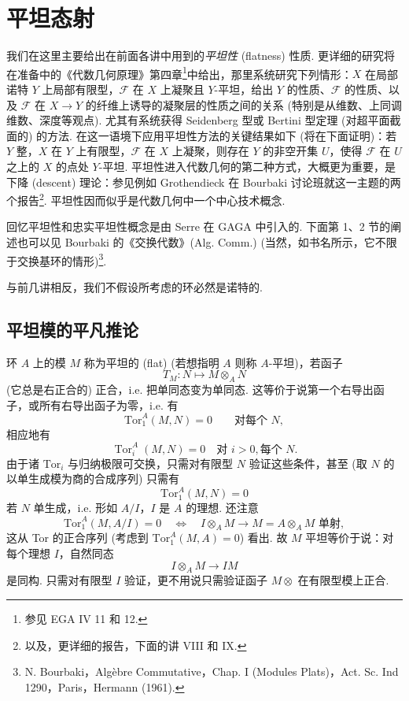 \chapter{平坦态射}

我们在这里主要给出在前面各讲中用到的\emph{平坦性} (flatness) 性质. 更详细的研究将在准备中的《代数几何原理》第四章\footnote{参见 EGA IV 11 和 12.}中给出，那里系统研究下列情形：$X$ 在局部诺特 $Y$ 上局部有限型，$\mathcal{F}$ 在 $X$ 上凝聚且 $Y$-平坦，给出 $Y$ 的性质、$\mathcal{F}$ 的性质、以及 $\mathcal{F}$ 在 $X \to Y$ 的纤维上诱导的凝聚层的性质之间的关系 (特别是从维数、上同调维数、深度等观点). 尤其有系统获得 Seidenberg 型或 Bertini 型定理 (对超平面截面的) 的方法. 在这一语境下应用平坦性方法的关键结果如下 (将在下面证明)：若 $Y$ 整，$X$ 在 $Y$ 上有限型，$\mathcal{F}$ 在 $X$ 上凝聚，则存在 $Y$ 的非空开集 $U$，使得 $\mathcal{F}$ 在 $U$ 之上的 $X$ 的点处 $Y$-平坦. 平坦性进入代数几何的第二种方式，大概更为重要，是下降 (descent) 理论：参见例如 Grothendieck 在 Bourbaki 讨论班就这一主题的两个报告\footnote{以及，更详细的报告，下面的讲 VIII 和 IX.}. 平坦性因而似乎是代数几何中一个中心技术概念.

回忆平坦性和忠实平坦性概念是由 Serre 在 GAGA 中引入的. 下面第 1、2 节的阐述也可以见 Bourbaki 的《交换代数》(Alg. Comm.) (当然，如书名所示，它不限于交换基环的情形)\footnote{N. Bourbaki，Algèbre Commutative，Chap. I (Modules Plats)，Act. Sc. Ind 1290，Paris，Hermann (1961).}.

与前几讲相反，我们不假设所考虑的环必然是诺特的.

\section{平坦模的平凡推论}

环 $A$ 上的模 $M$ 称为平坦的 (flat) (若想指明 $A$ 则称 $A$-平坦)，若函子
\[
T_M \colon N \longmapsto M \otimes_A N
\]
(它总是右正合的) 正合，i.e. 把单同态变为单同态. 这等价于说第一个右导出函子，或所有右导出函子为零，i.e. 有
\[
\mathrm{Tor}_{1}^{A}(M, N) = 0 \qquad \text{对每个 } N,
\]
相应地有
\[
\operatorname{Tor}_{i}^{A}(M, N) = 0 \quad \text{对 } i > 0, \text{每个 } N.
\]
由于诸 $\mathrm{Tor}_i$ 与归纳极限可交换，只需对有限型 $N$ 验证这些条件，甚至 (取 $N$ 的以单生成模为商的合成序列) 只需有
\[
\mathrm{Tor}_{1}^{A}(M, N) = 0
\]
若 $N$ 单生成，i.e. 形如 $A/I$，$I$ 是 $A$ 的理想. 还注意
\[
\mathrm{Tor}_{1}^{A}(M, A/I) = 0 \quad \Longleftrightarrow \quad I \otimes_A M \to M = A \otimes_A M \text{ 单射},
\]
这从 Tor 的正合序列 (考虑到 $\mathrm{Tor}_{1}^{A}(M, A) = 0$) 看出. 故 $M$ 平坦等价于说：对每个理想 $I$，自然同态
\[
I \otimes_A M \longrightarrow IM
\]
是同构. 只需对有限型 $I$ 验证，更不用说只需验证函子 $M \otimes$ 在有限型模上正合.


